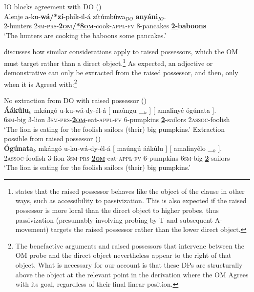 \documentclass[output=paper,colorlinks,citecolor=brown]{langscibook}
\begin{document}
\ea%
    \label{ex:branan:11}
    IO blocks agreement with DO \hfill{(\citealt[101, ex. 41a-b]{Mchombo2004})}\\
    \gll    Alenje a-ku-\textbf{wá/*zí}-phík-il-á zítúmbûwa$_{DO}$  \textbf{anyáni}$_{IO}$. \\
            2-hunters 2\textsc{sm-prs}-\underline{\textbf{\textsc{2om/*8om}}}-cook-\textsc{appl-fv} 8-pancakes \textbf{\underline{2-}baboons}  \\
    \glt    `The hunters are cooking the baboons some pancakes.'
\z

\citet{Mchombo2004} discusses how similar considerations apply to raised possessors, which the OM must target rather than a direct object.\footnote{\citeauthor{Mchombo2004} states that the raised possessor behaves like the object of the clause in other ways, such as accessibility to passivization. This is also expected if the raised possessor is more local than the direct object to higher probes, thus passivization (presumably involving probing by T and subsequent A-movement) targets the raised possessor rather than the lower direct object.} As expected, an adjective or demonstrative can only be extracted from the raised possessor, and then, only when it is Agreed with:\footnote{The benefactive arguments and raised possessors that intervene between the OM probe and the direct object nevertheless appear to the right of that object. What is necessary for our account is that these DPs are structurally above the object at the relevant point in the derivation where the OM Agrees with its goal, regardless of their final linear position.}

\ea%
    \label{ex:branan:12}
    No extraction from DO with raised possessor \hfill{(\citealt[55, ex. 22e]{Mchombo2004})}\\
    \gll    * \textbf{\'{A}ákûlu}$_{k}$ mkángó u-ku-wá-dy-él-á [ maûngu \_$_{k}$ ] [ amalinyé ógúnata ]. \\
            {} 6\textsc{sm}-big 3-lion 3\textsc{sm-prs}-\textbf{\underline{2\textsc{om}}}-eat-\textsc{appl-fv} {} 6-pumpkins {} {} {} \textbf{\underline{2}}-sailors 2\textsc{assoc}-foolish {} \\
    \glt    `The lion is eating for the foolish sailors (their) big pumpkins.'
\ex%
    \label{ex:branan:13}
    Extraction possible from raised possessor \hfill{(\citealt[56, ex. 22g]{Mchombo2004})}\\
    \gll    \textbf{\'{O}gúnata}$_{k}$ mkángó u-ku-wá-dy-él-á [ maúngú áákûlu ] [ amalinyêlo \_$_{k}$ ]. \\
            2\textsc{assoc}-foolish 3-lion 3\textsc{sm-prs}-\textbf{\underline{2\textsc{om}}}-eat-\textsc{appl-fv} {} 6-pumpkins 6\textsc{sm}-big  {} {} \textbf{\underline{2}}-sailors  \\
\glt        `The lion is eating for the foolish sailors (their) big pumpkins.'
\z
\end{document}
